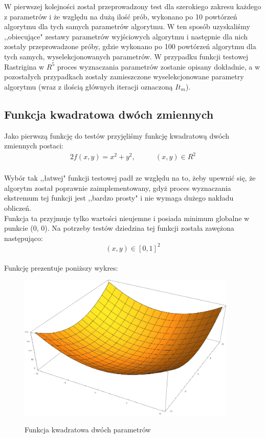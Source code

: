 \documentclass[twoside]{projektInzynierskiMS1}
\newcommand{\si}{ś}
\begin{document}
W pierwszej kolejno\si ci został przeprowadzony test dla szerokiego zakresu każdego z parametrów i że względu na dużą ilo\si ć prób, wykonano po 10 powtórzeń algorytmu dla tych samych parametrów algorytmu. W ten sposób uzyskali\si my ,,obiecujące" zestawy parametrów wyj\si ciowych algorytmu i następnie dla nich zostały przeprowadzone próby, gdzie wykonano po 100 powtórzeń algorytmu dla tych samych, wyselekcjonowanych parametrów. W przypadku funkcji testowej Rastrigina w $R^5$ proces wyznaczania parametrów zostanie opisany dokładnie, a w pozostałych przypadkach zostały zamieszczone wyselekcjonowane parametry algorytmu (wraz z ilo\si cią głównych iteracji oznaczoną $It_m$).



	\subsection{Funkcja kwadratowa dwóch zmiennych}
	Jako pierwszą funkcję do testów przyjęli\si my funkcję kwadratową dwóch zmiennych postaci:
\begin{alignat*}{2}
f(x, y) = x^2 + y^2,&\qquad  (x, y) \in R^2\\
\end{alignat*}

Wybór tak ,,łatwej" funkcji testowej padł ze względu na to, żeby upewnić się, że algorytm został poprawnie zaimplementowany, gdyż proces wyznaczania ekstremum tej funkcji jest ,,bardzo prosty" i nie wymaga dużego nakładu obliczeń. \\

Funkcja ta przyjmuje tylko warto\si ci nieujemne i posiada minimum globalne w punkcie (0, 0). Na potrzeby testów dziedzina tej funkcji została zawężona następująco:
\[(x, y)  \in [0,1]^2 \]\\ 


Funkcję prezentuje poniższy wykres:\\
\begin{figure}[H]
	\begin{center}
		\includegraphics[height=7cm]{pics/quadraticFunction1.png}\\
	\end{center}
	\caption{Funkcja kwadratowa dwóch parametrów}
\end{figure}
\end{document}
